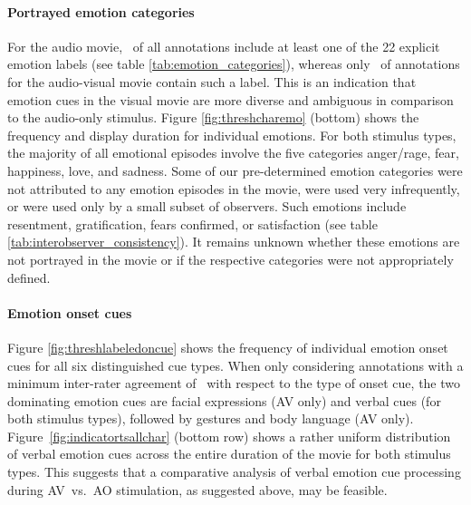 \documentclass[10pt,a4paper,twocolumn]{article}
\begin{document}
\paragraph{Portrayed emotion categories} For the audio movie,
\AOFracWithLabeledEmotions\ of all annotations include at least one of the 22
explicit emotion labels (see table \ref{tab:emotion_categories}), whereas only
\AVFracWithLabeledEmotions\ of annotations for the audio-visual movie contain
such a label. This is an indication that emotion cues in the visual movie are
more diverse and ambiguous in comparison to the audio-only stimulus. Figure
\ref{fig:threshcharemo} (bottom) shows the frequency and display duration for
individual emotions. For both stimulus types, the majority of all emotional
episodes involve the five categories anger/rage, fear, happiness, love, and
sadness. Some of our pre-determined emotion categories were not attributed
to any emotion episodes in the movie, were used very infrequently, or were used
only by a small subset of observers. Such emotions include resentment,
gratification, fears confirmed, or satisfaction (see table
\ref{tab:interobserver_consistency}). It remains unknown whether these
emotions are not portrayed in the movie or if the respective categories were not
appropriately defined.

\paragraph{Emotion onset cues} Figure \ref{fig:threshlabeledoncue} shows the
frequency of individual emotion onset cues for all six distinguished cue types.
When only considering annotations with a minimum inter-rater agreement of
\AVAggThresh\ with respect to the type of onset cue, the two dominating emotion
cues are facial expressions (AV only) and verbal cues (for both stimulus
types), followed by gestures and body language (AV only).
Figure~\ref{fig:indicatortsallchar} (bottom row) shows a rather uniform
distribution of verbal emotion cues across the entire duration of the movie for
both stimulus types. This suggests that a comparative analysis of verbal
emotion cue processing during AV~vs.~AO stimulation, as suggested above, may be
feasible.
\end{document}
